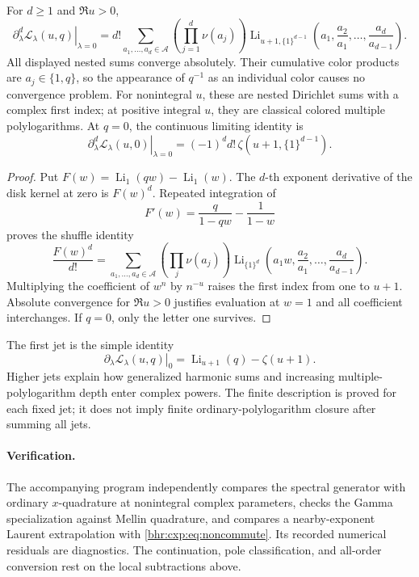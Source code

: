 \begin{proposition}
\label{bhr:cxp:prop:jets}
For \(d\ge1\) and \(\Re u>0\),
\begin{equation}\label{bhr:cxp:eq:MPL}
 \left.\partial_\lambda^d\mathcal L_\lambda(u,q)
                                      \right|_{\lambda=0}
 =d!\sum_{a_1,\ldots,a_d\in\mathcal A}
 \left(\prod_{j=1}^d\nu(a_j)\right)
 \operatorname{Li}_{u+1,\{1\}^{d-1}}
       \left(a_1,\frac{a_2}{a_1},\ldots,
                                \frac{a_d}{a_{d-1}}\right).
\end{equation}
All displayed nested sums converge absolutely.  Their cumulative
color products are \(a_j\in\{1,q\}\), so the appearance of
\(q^{-1}\) as an individual color causes no convergence problem.
For nonintegral \(u\), these are nested Dirichlet sums with a complex first index; at positive integral \(u\), they are classical colored multiple polylogarithms.
At \(q=0\), the continuous limiting identity is
\[
 \left.\partial_\lambda^d\mathcal L_\lambda(u,0)
                                      \right|_{\lambda=0}
       =(-1)^d d!\,\zeta(u+1,\{1\}^{d-1}).
\]
\end{proposition}

\begin{proof}
Put \(F(w)=\operatorname{Li}_1(qw)-\operatorname{Li}_1(w)\).
The \(d\)-th exponent derivative of the disk kernel at zero is
\(F(w)^d\).  Repeated integration of
\[
 F'(w)=\frac{q}{1-qw}-\frac1{1-w}
\]
proves the shuffle identity
\[
 \frac{F(w)^d}{d!}
 =\sum_{a_1,\ldots,a_d\in\mathcal A}
   \left(\prod_j\nu(a_j)\right)
 \operatorname{Li}_{\{1\}^d}
     \left(a_1w,\frac{a_2}{a_1},\ldots,
                                   \frac{a_d}{a_{d-1}}\right).
\]
Multiplying the coefficient of \(w^n\) by \(n^{-u}\) raises
the first index from one to \(u+1\).  Absolute convergence for
\(\Re u>0\) justifies evaluation at \(w=1\) and all coefficient
interchanges.  If \(q=0\), only the letter one survives.
\end{proof}

The first jet is the simple identity
\[
 \left.\partial_\lambda\mathcal L_\lambda(u,q)\right|_0
       =\operatorname{Li}_{u+1}(q)-\zeta(u+1).
\]
Higher jets explain how generalized harmonic sums and increasing
multiple-polylogarithm depth enter complex powers.  The finite
description is proved for each fixed jet; it does not imply finite
ordinary-polylogarithm closure after summing all jets.

\paragraph{Verification.}
The accompanying program independently compares the spectral
generator with ordinary \(x\)-quadrature at nonintegral complex
parameters, checks the Gamma specialization against Mellin
quadrature, and compares a nearby-exponent Laurent extrapolation
with \eqref{bhr:cxp:eq:noncommute}.  Its recorded numerical residuals
are diagnostics.  The continuation, pole classification, and
all-order conversion rest on the local subtractions above.

